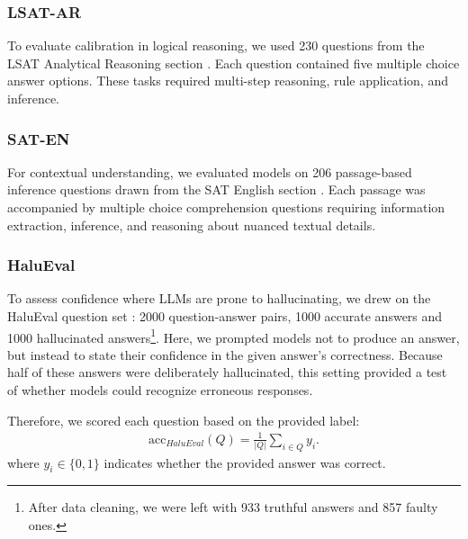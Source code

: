 \documentclass{article}
\begin{document}
\subsubsection{LSAT-AR}
To evaluate calibration in logical reasoning, we used 230 questions from the LSAT Analytical Reasoning section \citep{zhong2021arlsat}. Each question contained five multiple choice answer options. These tasks required multi-step reasoning, rule application, and inference. 

\subsubsection{SAT-EN}
For contextual understanding, we evaluated models on 206 passage-based inference questions drawn from the SAT English section \citep{zhong2023agieval}. Each passage was accompanied by multiple choice comprehension questions requiring information extraction, inference, and reasoning about nuanced textual details. 

\subsubsection{HaluEval}
To assess confidence where LLMs are prone to hallucinating, we drew on the HaluEval question set \citep{HaluEval}: 2000 question-answer pairs, 1000 accurate answers and 1000 hallucinated answers\footnote{After data cleaning, we were left with 933 truthful answers and 857 faulty ones.}. Here, we prompted models not to produce an answer, but instead to state their confidence in the given answer's correctness. Because half of these answers were deliberately hallucinated, this setting provided a test of whether models could recognize erroneous responses.  

Therefore, we scored each question based on the provided label:
\begin{align}
    \text{acc}_{HaluEval}({Q}) = \frac{1}{|Q|}\sum_{i\in Q} y_i.
\end{align}
where $y_i \in \{0,1\}$ indicates whether the provided answer was correct.
\end{document}
